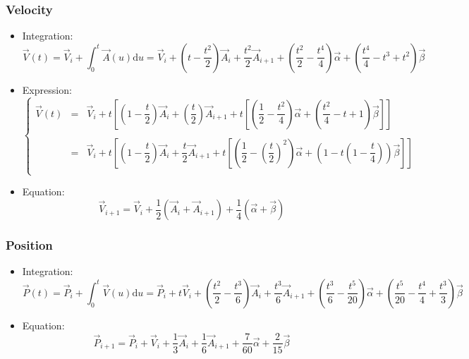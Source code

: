 \documentclass[aps,12pt]{revtex4}
\begin{document}
\subsubsection{Velocity}
\begin{itemize}
\item Integration:
\begin{equation}
	\vec{V}(t) = \vec{V}_i + \int_0^t \vec{A}(u)\mathrm{d}u = \vec{V}_i + \left(t-\dfrac{t^2}{2}\right) \vec{A}_i + \dfrac{t^2}{2} \vec{A}_{i+1} + \left(\dfrac{t^2}{2} - \dfrac{t^4}{4} \right) \vec{\alpha} + \left(\dfrac{t^4}{4} - t^3 + t^2\right) \vec{\beta}
\end{equation}

\item Expression:
\begin{equation}
\left\lbrace
\begin{array}{rcl}
 \vec{V}(t) & = &\vec{V}_i + t 
 \left[ \left(1-\dfrac{t}{2}\right) \vec{A}_i + \left(\dfrac{t}{2}\right) \vec{A}_{i+1} +
  t \left [
  \left(\dfrac{1}{2} - \dfrac{t^2}{4} \right) \vec{\alpha} + \left(\dfrac{t^2}{4} - t + 1\right) \vec{\beta}
  \right ]
 \right]\\
 \\
  & = & \vec{V}_i + t 
 \left[ \left(1-\dfrac{t}{2}\right) \vec{A}_i + \dfrac{t}{2} \vec{A}_{i+1} +
  t \left [
  \left(\dfrac{1}{2} -  \left(\dfrac{t}{2}\right)^2 \right) \vec{\alpha} + \left( 1-t \left(1-\dfrac{t}{4}\right)\right) \vec{\beta}
  \right ]
 \right]\\
 \end{array}
 \right.
\end{equation}

\item Equation:
\begin{equation}
\vec{V}_{i+1} = \vec{V}_i + \dfrac{1}{2}\left(\vec{A}_i + \vec{A}_{i+1}\right) + \dfrac{1}{4} \left( \vec{\alpha} + \vec{\beta}\right)
\end{equation}

\end{itemize}

\subsubsection{Position}
\begin{itemize}
\item Integration:
\begin{equation}
	\vec{P}(t) = \vec{P}_{i} + \int_0^t \vec{V}(u)\mathrm{d}u = \vec{P}_i + t \vec{V}_i 
	+ \left(\dfrac{t^2}{2} - \dfrac{t^3}{6}\right) \vec{A}_i + \dfrac{t^3}{6} \vec{A}_{i+1} 
	+ \left(\dfrac{t^3}{6} - \dfrac{t^5}{20} \right) \vec{\alpha}
	+ \left( \dfrac{t^5}{20} - \dfrac{t^4}{4} + \dfrac{t^3}{3} \right) \vec{\beta}
\end{equation}

\item Equation:
\begin{equation}
	\vec{P}_{i+1} = \vec{P}_i + \vec{V}_{i} + \dfrac{1}{3} \vec{A}_i + \dfrac{1}{6} \vec{A}_{i+1} + \dfrac{7}{60} \vec{\alpha} + \dfrac{2}{15} \vec{\beta}
\end{equation}

\end{itemize}
\end{document}
